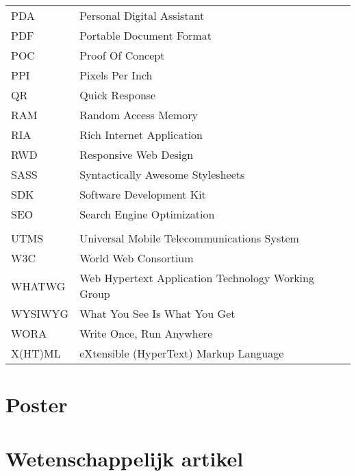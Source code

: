 \documentclass[master=cws,dutch,masteroption={vs,gs},inputenc=utf8]{kulemt}
\begin{document}
\begin{flushleft}
\begin{longtable}{p{2cm} l}
     PDA & Personal Digital Assistant \\
     PDF & Portable Document Format \\
     POC & Proof Of Concept \\
     PPI & Pixels Per Inch \\
     QR & Quick Response \\
     RAM & Random Access Memory \\
     RIA & Rich Internet Application \\
     RWD & Responsive Web Design \\
     SASS & Syntactically Awesome Stylesheets \\
     SDK & Software Development Kit \\
     SEO & Search Engine Optimization \\
     \sta{} & \st{} \\
     UTMS & Universal Mobile Telecommunications System \\
     W3C & World Web Consortium \\
     WHATWG & Web Hypertext Application Technology Working Group \\
     WYSIWYG & What You See Is What You Get \\
     WORA & Write Once, Run Anywhere \\
     X(HT)ML & eXtensible (HyperText) Markup Language \\ 
  \end{longtable}
\end{flushleft}

\mainmatter













\appendixpage*          
\appendix
\chapter{Poster}

\chapter{Wetenschappelijk artikel}





\backmatter


\end{document}
